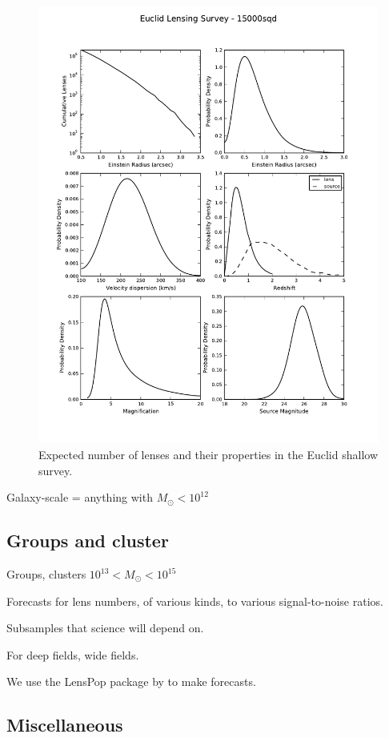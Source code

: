 \documentclass[twocolumn]{svjour3}
\begin{document}
\begin{figure}[t]
\centering
\includegraphics[width=0.7\hsize]{allplots_Euclid-3.pdf}
\caption{Expected number of lenses and their properties in the Euclid shallow survey.}
\end{figure}


Galaxy-scale = anything with $ M_{\odot} < 10^{12}$

\subsection{Groups and cluster}


Groups, clusters $ 10^{13}< M_{\odot} < 10^{15}$

Forecasts for lens numbers, of various kinds, to various signal-to-noise ratios.

Subsamples that science will depend on.

For deep fields, wide fields.

We use the {\sc LensPop} package by \citet{Collett2015} to make
forecasts.

\subsection{Miscellaneous}

\end{document}
